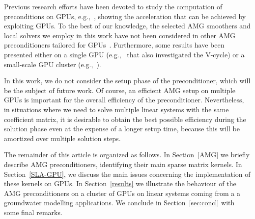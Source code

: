 Previous research efforts have been devoted to study the computation of preconditions on 
GPUs, e.g.,~\cite{BellDaltonOlson:2012,Dehnavi:2013,Emans:2012,Gandham:2014,Haase:2010,Naumov:2014,Wagner:2012}, 
showing the acceleration that can be achieved by exploiting GPUs. 
%
To the best of our knowledge, the selected AMG smoothers and local solvers we employ in this work 
have not been considered in other AMG preconditioners tailored for GPUs~\cite{BellDaltonOlson:2012,Naumov:2014,Wagner:2012}. 
Furthermore, some results have been presented either on a single GPU (e.g.,~\cite{HLiu:2015} that also investigated the V-cycle) 
or a small-scale GPU cluster (e.g.,~\cite{Emans:2012,Haase:2010}). %

In this work, we do not consider the setup phase of the preconditioner,
which will be the subject of future work. 
Of course, an efficient AMG setup on multiple GPUs is important for the overall efficiency of the
preconditioner. Nevertheless, in situations where we need to solve multiple
linear systems with the same coefficient matrix, it is desirable to obtain
the best possible efficiency during the solution phase even at the expense of a
longer setup time, because this will be amortized over multiple
solution steps.

The remainder of this article is organized as follows. In Section~\ref{AMG} we briefly describe AMG preconditioners,
identifying their main sparse matrix kernels. In Section~\ref{SLA-GPU}, we discuss the main issues
concerning the implementation of these kernels on GPUs. In Section~\ref{results} we illustrate the
behaviour of the AMG preconditioners on a cluster of GPUs on linear systems coming from a
a groundwater modelling applications. 
We conclude in Section~\ref{sec:concl} with some final remarks.  